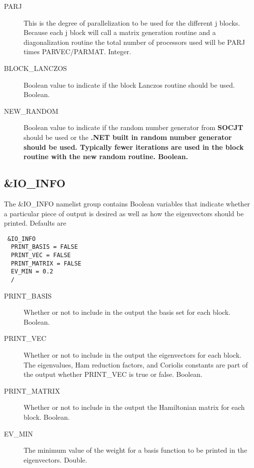 \documentclass{article}
\newcommand{\socjt}{{\bf SOCJT }}
\begin{document}
\begin{description}
\item[PARJ] This is the degree of parallelization to be used for
  the different j blocks.  Because each j block will call a matrix
  generation routine and a diagonalization routine the total number
  of processors used will be PARJ times PARVEC/PARMAT. Integer.

\item[BLOCK\_LANCZOS] Boolean value to indicate if the block Lanczos
  routine should be used. Boolean.

\item[NEW\_RANDOM] Boolean value to indicate if the random number
  generator from \socjt should be used or the \bf{.NET} built in
  random number generator should be used. Typically fewer iterations
  are used in the block routine with the new random routine. Boolean.

\end{description}

\subsection{\&IO\_INFO}

The \&IO\_INFO namelist group contains Boolean variables that
indicate whether a particular piece of output is desired as well
as how the eigenvectors should be printed. Defaults are

\begin{verbatim}
 &IO_INFO
  PRINT_BASIS = FALSE
  PRINT_VEC = FALSE
  PRINT_MATRIX = FALSE
  EV_MIN = 0.2
  /
\end{verbatim}

\begin{description}

\item[PRINT\_BASIS] Whether or not to include in the output the basis
  set for each block. Boolean.

\item[PRINT\_VEC] Whether or not to include in the output the eigenvectors
  for each block. The eigenvalues, Ham reduction factors, and Coriolis
  constants are part of the output whether PRINT\_VEC is true or
  false. Boolean.

\item[PRINT\_MATRIX] Whether or not to include in the output the Hamiltonian
  matrix for each block. Boolean.
  
\item[EV\_MIN] The minimum value of the weight for a basis function to be 
  printed in the eigenvectors. Double.

\end{description}
\end{document}
